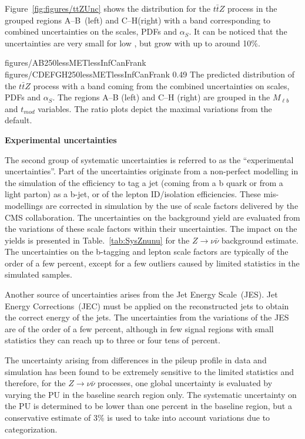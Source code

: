 Figure~\ref{fig:figures/ttZUnc} shows the  \MET distribution for the $t\bar{t}Z$ process in the grouped regions A--B~(left) and C--H(right) with a band corresponding to combined uncertainties on the scales, PDFs and $\alpha_{S}$. It can be noticed that the uncertainties are very small for low \MET, but grow with \MET up to around 10\%.

                 {figures/AB250lessMETlessInfCanFrank} %
                 {figures/CDEFGH250lessMETlessInfCanFrank} %
                 {0.49}       %
                 { The predicted \MET distribution of the $t\bar{t}Z$ process with a band coming from the combined uncertainties on scales, PDFs and $\alpha_{S}$. The regions A--B (left) and C--H (right) are grouped in the $M_{\ell b}$ and $t_{mod}$ variables. The ratio plots depict the maximal variations from the default. }

\textbf{Experimental uncertainties}

The second group of systematic uncertainties is referred to as the ``experimental uncertainties''. Part of the uncertainties originate from a non-perfect modelling in the simulation of the efficiency to tag a jet (coming from a b quark or from a light parton) as a b-jet, or of the lepton ID/isolation efficiencies. These mis-modellings are corrected in simulation by the use of scale factors delivered by the CMS collaboration.  The uncertainties on the background yield are evaluated from the variations of these scale factors within their uncertainties. The impact on the yields is presented in Table.~\ref{tab:SysZnunu} for the $Z \to \nu \bar{\nu}$ background estimate. The uncertainties on the b-tagging and lepton scale factors are typically of the order of a few percent, except for a few outliers caused by limited statistics in the simulated samples.

Another source of uncertainties arises from the Jet Energy Scale~(JES). Jet Energy Corrections~(JEC) must be applied on the reconstructed jets to obtain the correct energy of the jets. The uncertainties from the variations of the JES are of the order of a few percent, although in few signal regions with small statistics they can reach up to three or four tens of percent. 

The uncertainty arising from differences in the pileup profile in data and simulation has been found to be extremely sensitive to the limited statistics and therefore, for the $Z \to  \nu \bar{\nu}$ processes, one global uncertainty is evaluated by varying the PU in the baseline search region only. The systematic uncertainty on the PU is determined to be lower than one percent in the baseline region, but a conservative estimate of 3\% is used to take into account variations due to categorization. 

